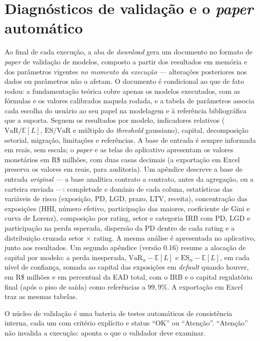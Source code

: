\documentclass[11pt,a4paper]{article}
\newcommand{\VaR}{\mathrm{VaR}}
\newcommand{\ES}{\mathrm{ES}}
\newcommand{\E}{\mathbb{E}}
\begin{document}
\section{Diagnósticos de validação e o \emph{paper} automático}
\label{sec:paper}

Ao final de cada execução, a aba de \emph{download} gera um documento no formato de \emph{paper} de validação de modelos, composto a partir dos resultados em memória e dos parâmetros vigentes \emph{no momento da execução} --- alterações posteriores nos dados ou parâmetros não o afetam. O documento é condicional ao que de fato rodou: a fundamentação teórica cobre apenas os modelos executados, com as fórmulas e os valores calibrados naquela rodada, e a tabela de parâmetros associa cada escolha do usuário ao seu papel na modelagem e à referência bibliográfica que a suporta. Seguem os resultados por modelo, indicadores relativos ($\VaR/\E[L]$, $\ES/\VaR$ e múltiplo do \emph{threshold} gaussiano), capital, decomposição setorial, migração, limitações e referências. A base de entrada é sempre informada em reais, sem escala; o \emph{paper} e as telas do aplicativo apresentam os valores monetários em R\$ milhões, com duas casas decimais (a exportação em Excel preserva os valores em reais, para auditoria). Um apêndice descreve a base de entrada \emph{original} --- a base analítica contrato a contrato, antes da agregação, ou a carteira enviada ---: completude e domínio de cada coluna, estatísticas das variáveis de risco (exposição, PD, LGD, prazo, LTV, receita), concentração das exposições (HHI, número efetivo, participação das maiores, coeficiente de Gini e curva de Lorenz), composição por rating, setor e categoria IRB com PD, LGD e participação na perda esperada, dispersão da PD dentro de cada rating e a distribuição cruzada setor $\times$ rating. A mesma análise é apresentada no aplicativo, junto aos resultados. Um segundo apêndice (versão 0.16) resume a alocação de capital por modelo: a perda inesperada, $\VaR_\alpha-\E[L]$ e $\ES_\alpha-\E[L]$, em cada nível de confiança, somada ao capital das exposições em \emph{default} quando houver, em R\$ milhões e em percentual da EAD total, com o IRB e o capital regulatório final (após o piso de saída) como referências a $99{,}9\%$. A exportação em Excel traz as mesmas tabelas.

O núcleo de validação é uma bateria de testes automáticos de consistência interna, cada um com critério explícito e status ``OK'' ou ``Atenção''. ``Atenção'' não invalida a execução: aponta o que o validador deve examinar.
\end{document}
